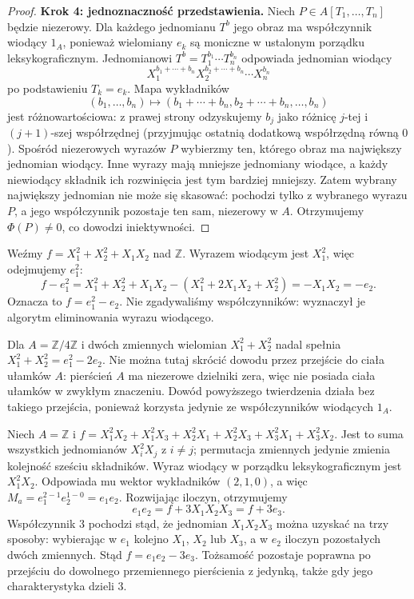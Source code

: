 \begin{proof}
\textbf{Krok 4: jednoznaczność przedstawienia.}
Niech $P\in A[T_1,\ldots,T_n]$ będzie niezerowy.
Dla każdego jednomianu $T^b$ jego obraz ma współczynnik
wiodący $1_A$, ponieważ wielomiany $e_k$ są moniczne
w ustalonym porządku leksykograficznym.
Jednomianowi $T^b=T_1^{b_1}\cdots T_n^{b_n}$ odpowiada
jednomian wiodący
\[
 X_1^{b_1+\cdots+b_n}X_2^{b_2+\cdots+b_n}
 \cdots X_n^{b_n}
\]
po podstawieniu $T_k=e_k$. Mapa wykładników
\[
 (b_1,\ldots,b_n)\longmapsto
 (b_1+\cdots+b_n,b_2+\cdots+b_n,\ldots,b_n)
\]
jest różnowartościowa: z prawej strony odzyskujemy
$b_j$ jako różnicę $j$-tej i $(j+1)$-szej współrzędnej
(przyjmując ostatnią dodatkową współrzędną równą $0$).
Spośród niezerowych wyrazów $P$ wybierzmy ten, którego
obraz ma największy jednomian wiodący. Inne wyrazy
mają mniejsze jednomiany wiodące, a każdy niewiodący
składnik ich rozwinięcia jest tym bardziej mniejszy.
Zatem wybrany największy jednomian nie może się skasować:
pochodzi tylko z wybranego wyrazu $P$, a jego współczynnik
pozostaje ten sam, niezerowy w $A$.
Otrzymujemy $\Phi(P)\ne0$, co dowodzi iniektywności.
\end{proof}

\begin{przyklad}\label{aa:prz:symmetric-algorithm}
Weźmy $f=X_1^2+X_2^2+X_1X_2$ nad $\mathbb Z$.
Wyrazem wiodącym jest $X_1^2$, więc odejmujemy $e_1^2$:
\[
 f-e_1^2
 =X_1^2+X_2^2+X_1X_2-(X_1^2+2X_1X_2+X_2^2)
 =-X_1X_2=-e_2.
\]
Oznacza to $f=e_1^2-e_2$. Nie zgadywaliśmy współczynników:
wyznaczył je algorytm eliminowania wyrazu wiodącego.
\end{przyklad}

\begin{przyklad}
Dla $A=\mathbb Z/4\mathbb Z$ i dwóch zmiennych
wielomian $X_1^2+X_2^2$ nadal spełnia
$X_1^2+X_2^2=e_1^2-2e_2$.
Nie można tutaj skrócić dowodu przez przejście do
ciała ułamków $A$: pierścień $A$ ma niezerowe dzielniki zera,
więc nie posiada ciała ułamków w zwykłym znaczeniu.
Dowód powyższego twierdzenia działa bez takiego przejścia,
ponieważ korzysta jedynie ze współczynników wiodących $1_A$.
\end{przyklad}

\begin{przyklad}\label{aa:prz:symmetric-three-elimination}
Niech $A=\mathbb Z$ i
$f=X_1^2X_2+X_1^2X_3+X_2^2X_1+X_2^2X_3+X_3^2X_1+X_3^2X_2$.
Jest to suma wszystkich jednomianów $X_i^2X_j$ z $i\ne j$;
permutacja zmiennych jedynie zmienia kolejność sześciu składników.
Wyraz wiodący w porządku leksykograficznym jest $X_1^2X_2$.
Odpowiada mu wektor wykładników $(2,1,0)$, a więc
$M_a=e_1^{2-1}e_2^{1-0}=e_1e_2$.
Rozwijając iloczyn, otrzymujemy
\[
 e_1e_2=f+3X_1X_2X_3=f+3e_3.
\]
Współczynnik $3$ pochodzi stąd, że jednomian $X_1X_2X_3$
można uzyskać na trzy sposoby: wybierając w $e_1$ kolejno
$X_1$, $X_2$ lub $X_3$, a w $e_2$ iloczyn pozostałych dwóch
zmiennych. Stąd $f=e_1e_2-3e_3$.
Tożsamość pozostaje poprawna po przejściu do dowolnego
przemiennego pierścienia z jedynką, także gdy jego charakterystyka
dzieli $3$.
\end{przyklad}

